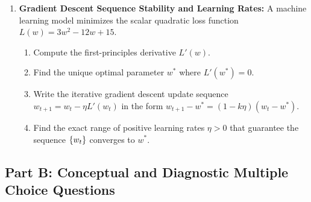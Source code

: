 \begin{enumerate}
    \item \textbf{Gradient Descent Sequence Stability and Learning Rates:} A machine learning model minimizes the scalar quadratic loss function $L(w) = 3w^2 - 12w + 15$.
    \begin{enumerate}
        \item Compute the first-principles derivative $L'(w)$.
        \item Find the unique optimal parameter $w^*$ where $L'(w^*) = 0$.
        \item Write the iterative gradient descent update sequence $w_{t+1} = w_t - \eta L'(w_t)$ in the form $w_{t+1} - w^* = (1 - k\eta)(w_t - w^*)$.
        \item Find the exact range of positive learning rates $\eta > 0$ that guarantee the sequence $\left\{w_t\right\}$ converges to $w^*$.
    \end{enumerate}
\end{enumerate}

\subsection*{Part B: Conceptual and Diagnostic Multiple Choice Questions}

